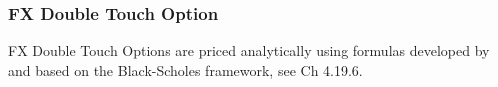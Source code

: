 \subsubsection{FX Double Touch Option}
\label{pricing:fx_doubletouchoption}

FX Double Touch Options are priced analytically using formulas developed by
\cite{Merton_1973} and \cite{Rubinstein_1991} based on the Black-Scholes framework,
see \cite{Haug_1997} Ch 4.19.6.